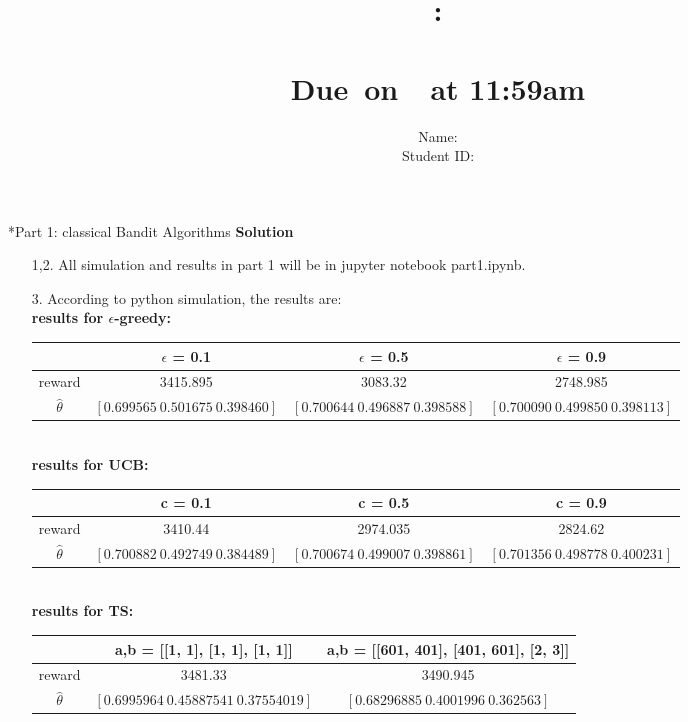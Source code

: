 \documentclass{article}
\title{
    \vspace{2in}
    \textmd{\textbf{\hmwkClass:\\  \hmwkTitle}}\\
    \normalsize\vspace{0.1in}\small{Due\ on\ \hmwkDueDate\ at 11:59am}\\
   \vspace{2in}
}
\author{
	Name: \textbf{\hmwkAuthorName} \\
	Student ID: \hmwkAuthorID}
\date{}
\newcommand{\solution}{\textbf{\Large Solution}}
\begin{document}
\maketitle
\pagebreak

\begin{homeworkProblem}*{Part 1: classical Bandit Algorithms}
    \solution
    \begin{enumerate}
        \item[1,2.]
        All simulation and results in part 1 will be in jupyter notebook part1.ipynb.
        \item[3.]
        According to python simulation, the results are:\\
        \textbf{results for $\epsilon$-greedy:}\\
        \begin{tabular}[t]{|c|c|c|c|}
        \hline
         & $\epsilon$ = 0.1 & $\epsilon$ = 0.5 & $\epsilon$ = 0.9 \\
        \hline
        reward & 3415.895 & 3083.32 & 2748.985 \\
        \hline
        $\hat{\theta}$ & $[0.699565\ 0.501675\ 0.398460]$ & $[0.700644\ 0.496887\ 0.398588]$ & $[0.700090\ 0.499850\ 0.398113]$ \\
        \hline
        \end{tabular}\\

        \textbf{results for UCB:}\\
        \begin{tabular}[t]{|c|c|c|c|}
        \hline
         & c = 0.1 & c = 0.5 & c = 0.9 \\
        \hline
        reward & 3410.44 & 2974.035 & 2824.62 \\
        \hline
        $\hat{\theta}$ & $[0.700882\ 0.492749\ 0.384489]$ & $[0.700674\ 0.499007\ 0.398861]$ & $[0.701356\ 0.498778\ 0.400231]$ \\
        \hline
        \end{tabular}\\

        \textbf{results for TS:}\\
        \begin{tabular}[t]{|c|c|c|}
        \hline
         & a,b = [[1, 1], [1, 1], [1, 1]] & a,b = [[601, 401], [401, 601], [2, 3]]\\
        \hline
        reward & 3481.33 & 3490.945 \\
        \hline
        $\hat{\theta}$ & $[0.6995964\ 0.45887541\ 0.37554019]$ & $[0.68296885\ 0.4001996\ 0.362563]$ \\
        \hline
        \end{tabular}\\


\end{enumerate}
\end{homeworkProblem}
\end{document}
